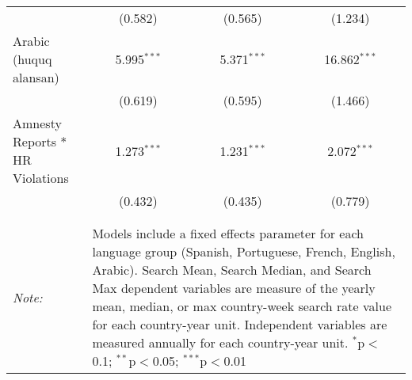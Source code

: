 \begin{table}[!htbp]
\begin{tabular}{@{\extracolsep{5pt}}lccc}
  & (0.582) & (0.565) & (1.234) \\ 
  Arabic (huquq alansan) & 5.995$^{***}$ & 5.371$^{***}$ & 16.862$^{***}$ \\ 
  & (0.619) & (0.595) & (1.466) \\ 
  Amnesty Reports * HR Violations & 1.273$^{***}$ & 1.231$^{***}$ & 2.072$^{***}$ \\ 
  & (0.432) & (0.435) & (0.779) \\ 
 \hline \\[-1.8ex] 
\hline 
\hline \\[-1.8ex] 
\textit{Note:}  & \multicolumn{3}{l}{\parbox[t]{8cm}{Models include a fixed effects parameter for each language group (Spanish, Portuguese, French, English, Arabic). Search Mean, Search Median, and Search Max dependent variables are measure of the yearly mean, median, or max country-week search rate value for each country-year unit. Independent variables are measured annually for each country-year unit. $^{*}$p$<$0.1; $^{**}$p$<$0.05; $^{***}$p$<$0.01}} \\ 
\end{tabular} 
\end{table} 
